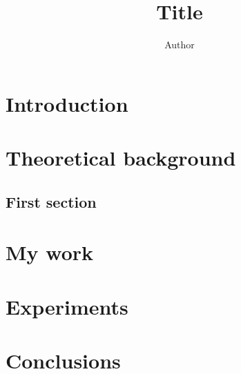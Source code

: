 \documentclass[twoside]{uva-inf-bachelor-thesis}
\title{Title}
\author{Author}
\begin{document}
\maketitle

\begin{abstract}
\lipsum[2]
\end{abstract}

\tableofcontents

\chapter{Introduction}
\chapter{Theoretical background}
\section{First section}
\lipsum[5]


\chapter{My work}
\lipsum[10]

\chapter{Experiments}

\chapter{Conclusions}
\end{document}

